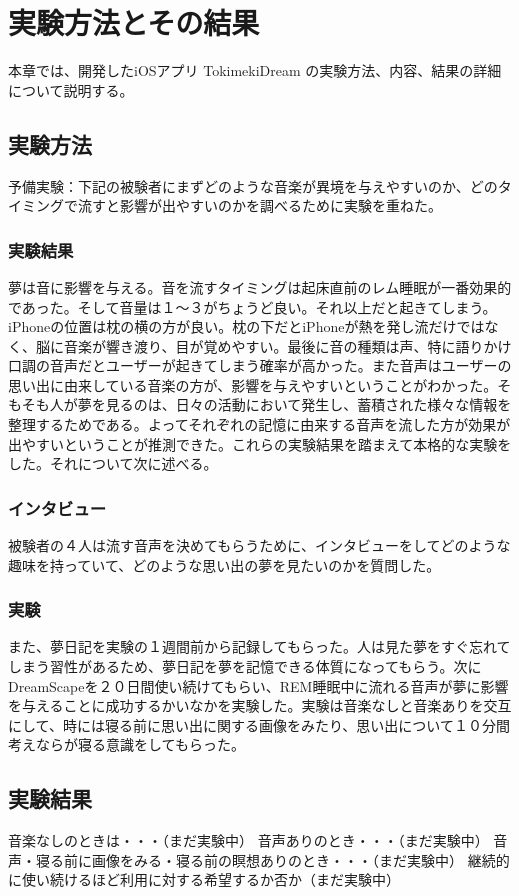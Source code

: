\chapter{実験方法とその結果}
\label{chap:ledoxea}

本章では、開発したiOSアプリ TokimekiDream の実験方法、内容、結果の詳細について説明する。

\section{実験方法}
予備実験：下記の被験者にまずどのような音楽が異境を与えやすいのか、どのタイミングで流すと影響が出やすいのかを調べるために実験を重ねた。

\subsection{実験結果}
夢は音に影響を与える。音を流すタイミングは起床直前のレム睡眠が一番効果的であった。そして音量は１〜３がちょうど良い。それ以上だと起きてしまう。iPhoneの位置は枕の横の方が良い。枕の下だとiPhoneが熱を発し流だけではなく、脳に音楽が響き渡り、目が覚めやすい。最後に音の種類は声、特に語りかけ口調の音声だとユーザーが起きてしまう確率が高かった。また音声はユーザーの思い出に由来している音楽の方が、影響を与えやすいということがわかった。そもそも人が夢を見るのは、日々の活動において発生し、蓄積された様々な情報を整理するためである。\cite{reasonToDream}よってそれぞれの記憶に由来する音声を流した方が効果が出やすいということが推測できた。これらの実験結果を踏まえて本格的な実験をした。それについて次に述べる。

\subsection{インタビュー}
被験者の４人は流す音声を決めてもらうために、インタビューをしてどのような趣味を持っていて、どのような思い出の夢を見たいのかを質問した。

\subsection{実験}
また、夢日記を実験の１週間前から記録してもらった。人は見た夢をすぐ忘れてしまう習性があるため、夢日記を夢を記憶できる体質になってもらう。次に
DreamScapeを２０日間使い続けてもらい、REM睡眠中に流れる音声が夢に影響を与えることに成功するかいなかを実験した。実験は音楽なしと音楽ありを交互にして、時には寝る前に思い出に関する画像をみたり、思い出について１０分間考えならが寝る意識をしてもらった。

\section{実験結果}
音楽なしのときは・・・（まだ実験中）
音声ありのとき・・・（まだ実験中）
音声・寝る前に画像をみる・寝る前の瞑想ありのとき・・・（まだ実験中）
継続的に使い続けるほど利用に対する希望するか否か（まだ実験中）
